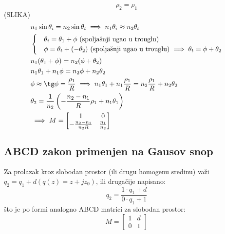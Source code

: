 \documentclass[fleqn]{report}
\begin{document}
\begin{itemize}
\begin{equation*}
              \rho_2 = \rho_1
          \end{equation*}
          (SLIKA)
          \begin{align*}
               & n_1 \sin\theta_i = n_2\sin\theta_t \implies n_1 \theta_i \approx n_2 \theta_t                                              \\
               & \begin{cases}
                      & \theta_i = \theta_1 + \phi \text{ (spoljašnji ugao u trouglu)}                                        \\
                      & \phi = \theta_t + (-\theta_2) \text{ (spoljašnji ugao u trouglu)} \implies \theta_t = \phi + \theta_2 \\
                 \end{cases}               \\
               & n_1 (\theta_1 + \phi) = n_2 (\phi + \theta_2)                                                                              \\
               & n_1 \theta_1 + n_1 \phi = n_2 \phi + n_2 \theta_2                                                                          \\
               & \phi \approx \tg\phi = \frac{\rho_1}{R} \implies n_1 \theta_1 + n_1 \frac{\rho_1}{R} = n_2 \frac{\rho_1}{R} + n_2 \theta_2 \\
               & \theta_2 = \frac{1}{n_2} \left(-\frac{n_2 - n_1}{R} \rho_1 + n_1 \theta_1\right)                                           \\
               & \implies M = \begin{bmatrix}
                                  1                       & 0               \\
                                  -\frac{n_2 - n_1}{n_2R} & \frac{n_1}{n_2}
                              \end{bmatrix}
          \end{align*}
\end{itemize}

\subsection{ABCD zakon primenjen na Gausov snop}

Za prolazak kroz slobodan prostor (ili drugu homogenu sredinu) važi $q_2 = q_1 + d (q(z) = z  + jz_0)$, ili drugačije napisano:
\begin{equation*}
    q_2 = \frac{1 \cdot q_1 + d}{0 \cdot q_1 + 1}
\end{equation*}
što je po formi analogno ABCD matrici za slobodan prostor:
\begin{equation*}
    M = \begin{bmatrix}
        1 & d \\
        0 & 1
    \end{bmatrix}
\end{equation*}
\end{document}
